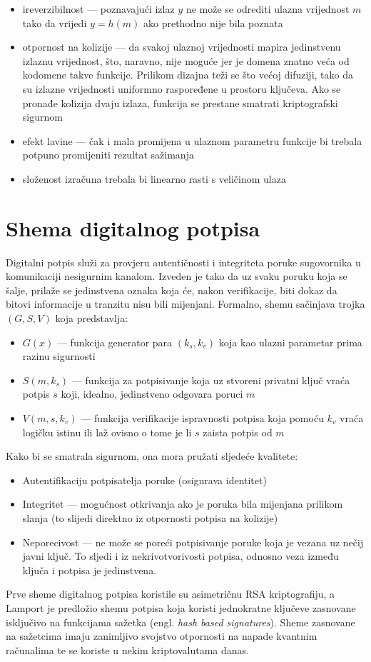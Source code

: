 \documentclass[utf8, zavrsni]{fer}
\begin{document}
\begin{itemize}
	\item ireverzibilnost --- poznavajući izlaz $y$ ne može se odrediti ulazna vrijednost $m$ tako da vrijedi $y = h(m)$ ako prethodno nije bila poznata
	\item otpornost na kolizije --- da svakoj ulaznoj vrijednosti mapira jedinstvenu izlaznu vrijednost, što, naravno, nije moguće jer je domena znatno veća od kodomene takve funkcije. Prilikom dizajna teži se što većoj difuziji, tako da su izlazne vrijednosti uniformno raspoređene u prostoru ključeva. Ako se pronađe kolizija dvaju izlaza, funkcija se prestane smatrati kriptografski sigurnom
	\item efekt lavine --- čak i mala promijena u ulaznom parametru funkcije bi trebala potpuno promijeniti rezultat sažimanja
	\item složenost izračuna trebala bi linearno rasti s veličinom ulaza
\end{itemize}

\section{Shema digitalnog potpisa}
Digitalni potpis služi za provjeru autentičnosti i integriteta poruke sugovornika u komunikaciji nesigurnim kanalom. Izveden je tako da uz svaku poruku koja se šalje, prilaže se jedinstvena oznaka koja će, nakon verifikacije, biti dokaz da bitovi informacije u tranzitu nisu bili mijenjani. Formalno, shemu sačinjava trojka $(G, S, V)$ koja predstavlja:
\begin{itemize}
	\item $G(x)$ --- funkcija generator para $(k_{s}, k_{v})$ koja kao ulazni parametar prima razinu sigurnosti
	\item $S(m, k_{s})$ --- funkcija za potpisivanje koja uz stvoreni privatni ključ vraća potpis $s$ koji, idealno, jedinstveno odgovara poruci $m$
	\item $V(m, s, k_{v})$ --- funkcija verifikacije ispravnosti potpisa koja pomoću $k_{v}$ vraća logičku istinu ili laž ovisno o tome je li $s$ zaista potpis od $m$
\end{itemize}
Kako bi se smatrala sigurnom, ona mora pružati sljedeće kvalitete:
\begin{itemize}
	\item Autentifikaciju potpisatelja poruke (osigurava identitet)
	\item Integritet --- mogućnost otkrivanja ako je poruka bila mijenjana prilikom slanja (to slijedi direktno iz otpornosti potpisa na kolizije)
	\item Neporecivost --- ne može se poreći potpisivanje poruke koja je vezana uz nečij javni ključ. To sljedi i iz nekrivotvorivosti potpisa, odnosno veza između ključa i potpisa je jedinstvena.
\end{itemize}
Prve sheme digitalnog potpisa koristile su asimetričnu RSA kriptografiju, a Lamport je predložio shemu potpisa koja koristi jednokratne ključeve zasnovane isključivo na funkcijama sažetka (engl. \textit{hash based signatures}). Sheme zasnovane na sažetcima imaju zanimljivo svojstvo otpornosti na napade kvantnim računalima te se koriste u nekim kriptovalutama danas.
\end{document}
